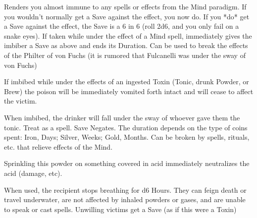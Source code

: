{\begin{multicols}{2}
\CHYMISTRY[
  Name=Fulcanelli's Clarifying Elixir,
  Link=chymistry-fulcanelli-clarifying-elixir,
  Cost=500\AG,
  Duration=until Bivouac/0,
  Toxin=No,
  Narcotic=No 
]


Renders you almost immune to any spells or effects from the Mind paradigm.  If you wouldn't normally get a Save against the effect, you now do.  If you *do* get a Save against the effect, the Save is a 6 in 6 (roll 2d6, and you only fail on a snake eyes).  If taken while under the effect of a Mind spell, immediately gives the imbiber a Save as above and ends its Duration.  Can be used to break the effects of the Philter of von Fuchs (it is rumored that Fulcanelli was under the sway of von Fuchs)

\CHYMISTRY[
  Name=Liebnitz Purgation,
  Link=chymistry-liebnitz-purgation,
  Cost=500\AG,
  Duration=0 ,
  Toxin=No,
  Narcotic=No 
]

If imbibed while under the effects of an ingested Toxin (Tonic, drunk Powder, or Brew) the poison will be immediately vomited forth intact and will cease to affect the victim.  

\CHYMISTRY[
  Name=Philter of von Fuchs,
  Link=chymistry-philter-von-Fuchs,
  Cost=varies,
  Duration=varies ,
  Toxin=Yes,
  Narcotic=No 
]

When imbibed, the drinker will fall under the sway of whoever gave them the tonic.  Treat as a  spell.  Save Negates.  The duration depends on the type of coins spent:  Iron, Days; Silver, Weeks; Gold, Months.  Can be broken by spells, rituals, etc. that relieve effects of the Mind.


  \CHYMISTRY[
    Name=Dastin's Basic Talc,
    Link=chymistry-dastins-basic talc,
    Cost=500\FE,
    Duration=0 ,
    Toxin=No,
    Narcotic=No 
  ]


  Sprinkling this powder on something covered in acid immediately neutralizes the acid (damage, etc).


  \CHYMISTRY[
    Name=Mermaid's Kiss,
    Link=chymistry-mermaids-kiss,
    Cost=500\AG,
    Duration=0 ,
    Toxin=Yes,
    Narcotic=No 
  ]


  When used, the recipient stops breathing for d6 Hours.  They can feign death or travel underwater, are not affected by inhaled powders or gases, and are unable to speak or cast spells.  Unwilling victims get a Save (as if this were a Toxin)




\end{multicols}}

